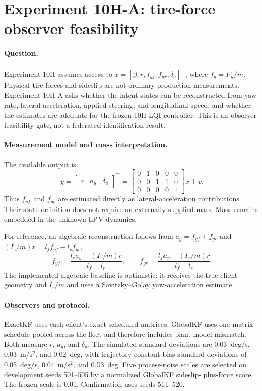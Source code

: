 \section{Experiment 10H-A: tire-force observer feasibility}
\label{sec:experiment10ha}

\paragraph{Question.}
Experiment 10H assumes access to
$x=[\beta,r,f_{yf},f_{yr},\delta_a]^\top$, where $f_y=F_y/m$. Physical tire
forces and sideslip are not ordinary production measurements. Experiment
10H-A asks whether the latent states can be reconstructed from yaw rate,
lateral acceleration, applied steering, and longitudinal speed, and whether
the estimates are adequate for the frozen 10H LQI controller. This is an
observer feasibility gate, not a federated identification result.

\paragraph{Measurement model and mass interpretation.}
The available output is
\begin{equation}
 y=\begin{bmatrix}r&a_y&\delta_a\end{bmatrix}^\top
 =\begin{bmatrix}
 0&1&0&0&0\\
 0&0&1&1&0\\
 0&0&0&0&1
 \end{bmatrix}x+v.
\end{equation}
Thus $f_{yf}$ and $f_{yr}$ are estimated directly as lateral-acceleration
contributions. Their state definition does not require an externally supplied
mass. Mass remains embedded in the unknown LPV dynamics.

For reference, an algebraic reconstruction follows from
$a_y=f_{yf}+f_{yr}$ and
$(I_z/m)\dot r=l_ff_{yf}-l_rf_{yr}$,
\begin{equation}
 f_{yf}=\frac{l_ra_y+(I_z/m)\dot r}{l_f+l_r},\qquad
 f_{yr}=\frac{l_fa_y-(I_z/m)\dot r}{l_f+l_r}.
\end{equation}
The implemented algebraic baseline is optimistic: it receives the true client
geometry and $I_z/m$ and uses a Savitzky--Golay yaw-acceleration estimate.

\paragraph{Observers and protocol.}
ExactKF uses each client's exact scheduled matrices. GlobalKF uses one matrix
schedule pooled across the fleet and therefore includes plant-model mismatch.
Both measure $r$, $a_y$, and $\delta_a$. The simulated standard deviations are
0.03~deg/s, 0.03~m/s$^2$, and 0.02~deg, with trajectory-constant bias standard
deviations of 0.05~deg/s, 0.04~m/s$^2$, and 0.03~deg. Five process-noise scales
are selected on development seeds 501--505 by a normalized GlobalKF sideslip-
plus-force score. The frozen scale is 0.01. Confirmation uses seeds 511--520.

